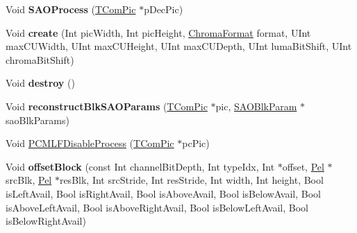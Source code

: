 \begin{DoxyCompactItemize}
\item 
\mbox{\label{class_t_com_sample_adaptive_offset_a45651c2d247bc0727afef445cd86a773}} 
Void {\bfseries S\+A\+O\+Process} (\hyperlink{class_t_com_pic}{T\+Com\+Pic} $\ast$p\+Dec\+Pic)
\item 
\mbox{\label{class_t_com_sample_adaptive_offset_a6e1fc003ae413f08fcf16c4c7a9714a1}} 
Void {\bfseries create} (Int pic\+Width, Int pic\+Height, \hyperlink{_type_def_8h_a4a6c51c10f2eb04abc7209db7caff39f}{Chroma\+Format} format, U\+Int max\+C\+U\+Width, U\+Int max\+C\+U\+Height, U\+Int max\+C\+U\+Depth, U\+Int luma\+Bit\+Shift, U\+Int chroma\+Bit\+Shift)
\item 
\mbox{\label{class_t_com_sample_adaptive_offset_a01bd3f070a0252ce87ec6c99d21b4dcf}} 
Void {\bfseries destroy} ()
\item 
\mbox{\label{class_t_com_sample_adaptive_offset_a6929928910b673b9972ff4cfbd2c8e8f}} 
Void {\bfseries reconstruct\+Blk\+S\+A\+O\+Params} (\hyperlink{class_t_com_pic}{T\+Com\+Pic} $\ast$pic, \hyperlink{struct_s_a_o_blk_param}{S\+A\+O\+Blk\+Param} $\ast$sao\+Blk\+Params)
\item 
Void \hyperlink{class_t_com_sample_adaptive_offset_a29e664fe0b361ebc41344885fd0bf1c5}{P\+C\+M\+L\+F\+Disable\+Process} (\hyperlink{class_t_com_pic}{T\+Com\+Pic} $\ast$pc\+Pic)
\item 
\mbox{\label{class_t_com_sample_adaptive_offset_a3c35ba253d55dacdfcb9aaf83926f6ed}} 
Void {\bfseries offset\+Block} (const Int channel\+Bit\+Depth, Int type\+Idx, Int $\ast$offset, \hyperlink{_type_def_8h_af92141699657699b4b547be0c8517541}{Pel} $\ast$src\+Blk, \hyperlink{_type_def_8h_af92141699657699b4b547be0c8517541}{Pel} $\ast$res\+Blk, Int src\+Stride, Int res\+Stride, Int width, Int height, Bool is\+Left\+Avail, Bool is\+Right\+Avail, Bool is\+Above\+Avail, Bool is\+Below\+Avail, Bool is\+Above\+Left\+Avail, Bool is\+Above\+Right\+Avail, Bool is\+Below\+Left\+Avail, Bool is\+Below\+Right\+Avail)
\item 
\mbox{\label{class_t_com_sample_adaptive_offset_a0efe5807b1738dcc6b7456d98bd13cdf}} 

\end{DoxyCompactItemize}
